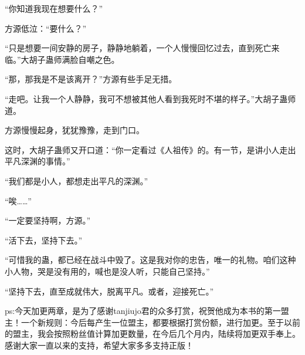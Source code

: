 \begin{this_body}
“你知道我现在想要什么？”

方源低泣：“要什么？”

“只是想要一间安静的房子，静静地躺着，一个人慢慢回忆过去，直到死亡来临。”大胡子蛊师满脸自嘲之色。

“那，那我是不是该离开？”方源有些手足无措。

“走吧。让我一个人静静，我可不想被其他人看到我死时不堪的样子。”大胡子蛊师道。

方源慢慢起身，犹犹豫豫，走到门口。

这时，大胡子蛊师又开口道：“你一定看过《人祖传》的。有一节，是讲小人走出平凡深渊的事情。”

“我们都是小人，都想走出平凡的深渊。”

“唉……”

“一定要坚持啊，方源。”

“活下去，坚持下去。”

“可惜我的蛊，都已经在战斗中毁了。这是我对你的忠告，唯一的礼物。咱们这种小人物，哭是没有用的，喊也是没人听，只能自己坚持。”

“坚持下去，直至成就伟大，脱离平凡。或者，迎接死亡。”

ps:今天加更两章，是为了感谢tanjiujo君的众多打赏，祝贺他成为本书的第一盟主！一个新规则：今后每产生一位盟主，都要根据打赏份额，进行加更。至于以前的盟主，我会按照粉丝值计算加更数量，在今后几个月内，陆续将加更双手奉上。感谢大家一直以来的支持，希望大家多多支持正版！

\end{this_body}
